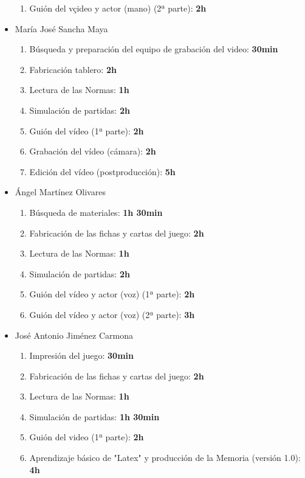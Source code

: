 \documentclass[11 pt]{book}
\begin{document}
\begin{itemize}
\begin{enumerate}
					    \item Guión del vçideo y actor (mano) (2ª parte): \textbf{2h}
				    \end{enumerate}
			    \item María José Sancha Maya
				    \begin{enumerate}
					    \item Búsqueda y preparación del equipo de grabación del video: \textbf{30min}
					    \item Fabricación tablero: \textbf{2h}
					    \item Lectura de las Normas: \textbf{1h}
					    \item Simulación de partidas: \textbf{2h}
					    \item Guión del vídeo (1ª parte): \textbf{2h}
					    \item Grabación del vídeo (cámara): \textbf{2h}
					    \item Edición del vídeo (postproducción): \textbf{5h}
				    \end{enumerate}
			    \item Ángel Martínez Olivares
				    \begin{enumerate}
					    \item Búsqueda de materiales: \textbf{1h 30min}
					    \item Fabricación de las fichas y cartas del juego: \textbf{2h}
					    \item Lectura de las Normas: \textbf{1h}
					    \item Simulación de partidas: \textbf{2h}
					    \item Guión del vídeo y actor (voz) (1ª parte): \textbf{2h}
					    \item Guión del vídeo y actor (voz) (2ª parte): \textbf{3h}
				    \end{enumerate}
			    \item José Antonio Jiménez Carmona
				    \begin{enumerate}
					    \item Impresión del juego: \textbf{30min}
					    \item Fabricación de las fichas y cartas del juego: \textbf{2h}
					    \item Lectura de las Normas: \textbf{1h}
					    \item Simulación de partidas: \textbf{1h 30min}
					    \item Guión del video (1ª parte): \textbf{2h}
					    \item Aprendizaje básico de "Latex" y producción de la Memoria (versión 1.0): \textbf{4h}
				    \end{enumerate}
		    \end{itemize}
		    
\end{document}

